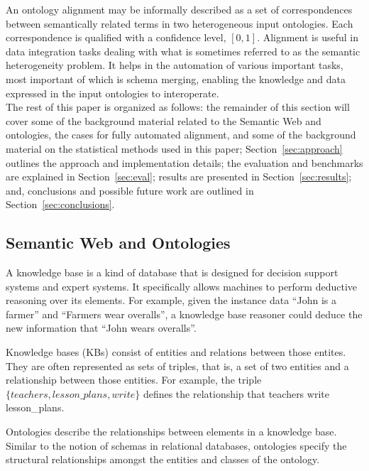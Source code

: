 \documentclass[letterpaper,twocolumn,12pt]{article}
\begin{document}
An ontology alignment may be informally described as a set of correspondences 
between semantically related terms in two heterogeneous input ontologies. 
Each correspondence is qualified with a confidence level, $[0,1]$.
Alignment is useful in data integration tasks dealing with what is sometimes 
referred to as the semantic heterogeneity problem. 
It helps in the automation of various important tasks, most important of which 
is schema merging, enabling the knowledge and data expressed in the input 
ontologies to interoperate. \\

\noindent The rest of this paper is organized as follows: 
the remainder of this section will cover some of the background material related 
to the Semantic Web and ontologies, the cases for fully automated alignment, 
and some of the background material on the statistical methods used in this paper; 
Section~\ref{sec:approach} outlines the approach and implementation details; 
the evaluation and benchmarks are explained in Section~\ref{sec:eval}; 
results are presented in Section~\ref{sec:results}; and, 
conclusions and possible future work are outlined in Section~\ref{sec:conclusions}.

\subsection{Semantic Web and Ontologies}
\label{subsec:semanticweb}

A knowledge base is a kind of database that is designed 
for decision support systems and expert systems. It specifically allows
machines to perform deductive reasoning over its elements.
For example, given the instance data ``John is a farmer'' and ``Farmers
wear overalls'', a knowledge base reasoner could deduce the new information
that ``John wears overalls''.

Knowledge bases (KBs) consist of entities and
relations between those entites. They are often represented as sets of
triples, that is, a set of two entities and a relationship between those
entities. For example, the triple ${\{teachers, lesson\_plans, write\}}$
defines the relationship that teachers write lesson\_plans.

Ontologies describe the relationships between elements in a knowledge base.
Similar to the notion of schemas in relational databases, ontologies specify
the structural relationships amongst the entities and classes of the ontology.
\end{document}
